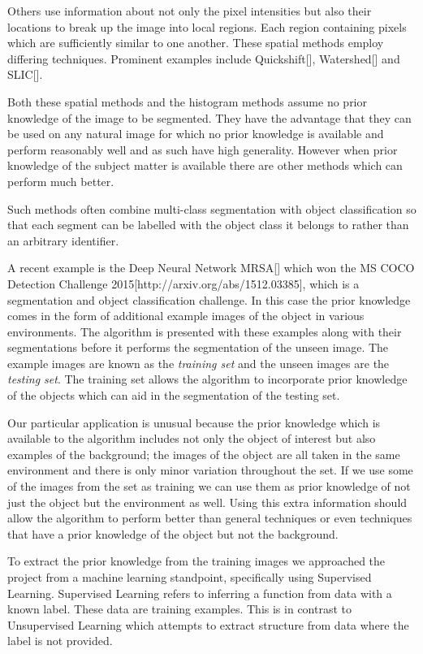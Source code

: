 \documentclass[12pt]{IIBproject}
\begin{document}
Others use information about not only the pixel intensities but also their locations to break up the image into local regions. Each region containing pixels which are sufficiently similar to one another. These spatial methods employ differing techniques.  Prominent examples include Quickshift[], Watershed[] and SLIC[].

 Both these spatial methods and the histogram methods assume no prior knowledge of the image to be segmented. They have the advantage that they can be used on any natural image for which no prior knowledge is available and perform reasonably well and as such have high generality. However when prior knowledge of the subject matter is available there are other methods which can perform much better. 
 
 Such methods often combine multi-class segmentation with object classification so that each segment can be labelled with the object class it belongs to rather than an arbitrary identifier. 
 
 A recent example is the Deep Neural Network MRSA[] which won the MS COCO Detection Challenge 2015[http://arxiv.org/abs/1512.03385], which is a segmentation and object classification challenge. In this case the prior knowledge comes in the form of additional example images of the object in various environments. The algorithm is presented with these examples along with their segmentations before it performs the segmentation of the unseen image. The example images are known as the \emph{training set} and the unseen images are the \emph{testing set}. The training set allows the algorithm to incorporate prior knowledge of the objects which can aid in the segmentation of the testing set.

Our particular application is unusual because the prior knowledge which is available to the algorithm includes not only the object of interest but also examples of the background; the images of the object are all taken in the same environment and there is only minor variation throughout the set. If we use some of the images from the set as training we can use them as prior knowledge of not just the object but the environment as well. Using this extra information should allow the algorithm to perform better than general techniques or even techniques that have a prior knowledge of the object but not the background. 

To extract the prior knowledge from the training images we approached the project from a machine learning standpoint, specifically using Supervised Learning. Supervised Learning refers to inferring a function from data with a known label. These data are training examples. This is in contrast to Unsupervised Learning which attempts to extract structure from data where the label is not provided. 
\end{document}
